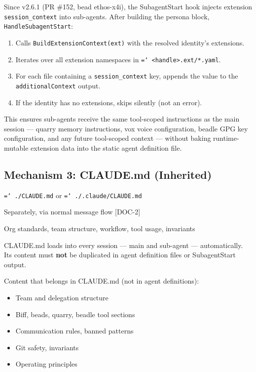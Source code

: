\documentclass[a4paper,10pt]{article}
\newcommand{\fpath}[1]{\texttt{\hyphenchar\font=`\/ #1}}
\newcommand{\field}[1]{\texttt{#1}}
\newcommand{\cmd}[1]{\texttt{#1}}
\newcommand{\coderef}[1]{\textsf{\small [#1]}}
\begin{document}
Since v2.6.1 (PR \#152, bead ethos-x4i), the SubagentStart hook
injects extension \field{session\_context} into sub-agents. After
building the persona block, \cmd{HandleSubagentStart}:

\begin{enumerate}
  \item Calls \cmd{BuildExtensionContext(ext)} with the resolved
    identity's extensions.
  \item Iterates over all extension namespaces in
    \fpath{<handle>.ext/*.yaml}.
  \item For each file containing a \field{session\_context} key,
    appends the value to the \field{additionalContext} output.
  \item If the identity has no extensions, skips silently (not an
    error).
\end{enumerate}

This ensures sub-agents receive the same tool-scoped instructions
as the main session --- quarry memory instructions, vox voice
configuration, beadle GPG key configuration, and any future
tool-scoped context --- without baking runtime-mutable extension
data into the static agent definition file.

\subsection{Mechanism 3: CLAUDE.md (Inherited)}

\begin{description}[style=nextline]
  \item[File] \fpath{./CLAUDE.md} or \fpath{./.claude/CLAUDE.md}
  \item[Loaded] Separately, via normal message flow \coderef{DOC-2}
  \item[Content] Org standards, team structure, workflow, tool
    usage, invariants
\end{description}

CLAUDE.md loads into every session --- main and sub-agent ---
automatically. Its content must \textbf{not} be duplicated in agent
definition files or SubagentStart output.

Content that belongs in CLAUDE.md (not in agent definitions):

\begin{itemize}
  \item Team and delegation structure
  \item Biff, beads, quarry, beadle tool sections
  \item Communication rules, banned patterns
  \item Git safety, invariants
  \item Operating principles
\end{itemize}
\end{document}
